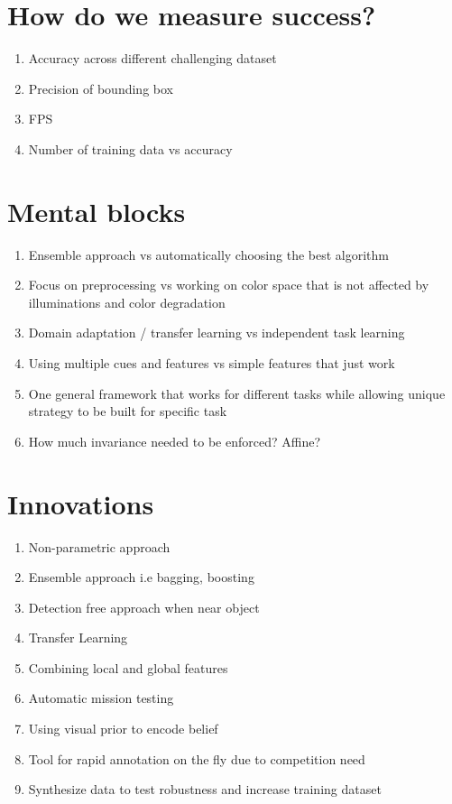 \section{How do we measure success?}

\begin{enumerate}
    \item Accuracy across different challenging dataset
    \item Precision of bounding box
    \item FPS
    \item Number of training data vs accuracy 
\end{enumerate}

\section{Mental blocks}

\begin{enumerate}
    \item Ensemble approach vs automatically choosing the best algorithm
    \item Focus on preprocessing vs working on color space that is not affected
          by illuminations and color degradation
    \item Domain adaptation / transfer learning vs independent task learning
    \item Using multiple cues and features vs simple features that just work
    \item One general framework that works for different tasks while allowing
          unique strategy to be built for specific task
    \item How much invariance needed to be enforced? Affine?
\end{enumerate}

\section{Innovations}

\begin{enumerate}
    \item Non-parametric approach
    \item Ensemble approach i.e bagging, boosting
    \item Detection free approach when near object
    \item Transfer Learning
    \item Combining local and global features
    \item Automatic mission testing 
    \item Using visual prior to encode belief
    \item Tool for rapid annotation on the fly due to competition need
    \item Synthesize data to test robustness and increase training dataset

\end{enumerate}

